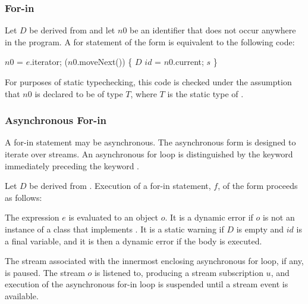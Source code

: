 \documentclass{article}
\begin{document}


\subsubsection{For-in}

\LMHash{}
Let $D$ be derived from 
and let $n0$ be an identifier that does not occur anywhere in the program.
A for statement of the form  is equivalent to the following code:

\begin{dartCode}
\VAR{} $n0$ = $e$.iterator;
\WHILE{} ($n0$.moveNext()) \{
   $D$ $id$ = $n0$.current;
   $s$
\}
\end{dartCode}

For purposes of static typechecking,
this code is checked under the assumption that $n0$ is declared to be of type $T$,
where $T$ is the static type of .



\subsubsection{Asynchronous For-in}

\LMHash{}
A for-in statement may be asynchronous.
The asynchronous form is designed to iterate over streams.
An asynchronous for loop is distinguished by the keyword \AWAIT{} immediately preceding the keyword \FOR.

\LMHash{}
Let $D$ be derived from .
Execution of a for-in statement, $f$, of the form
proceeds as follows:

\LMHash{}
The expression $e$ is evaluated to an object $o$.
It is a dynamic error if $o$ is not an instance of a class that implements .
It is a static warning if $D$ is empty and $id$ is a final variable,
and it is then a dynamic error if the body is executed.

\LMHash{}
The stream associated with the innermost enclosing asynchronous for loop, if any, is paused.
The stream $o$ is listened to, producing a stream subscription $u$,
and execution of the asynchronous for-in loop is suspended
until a stream event is available.
\end{document}
